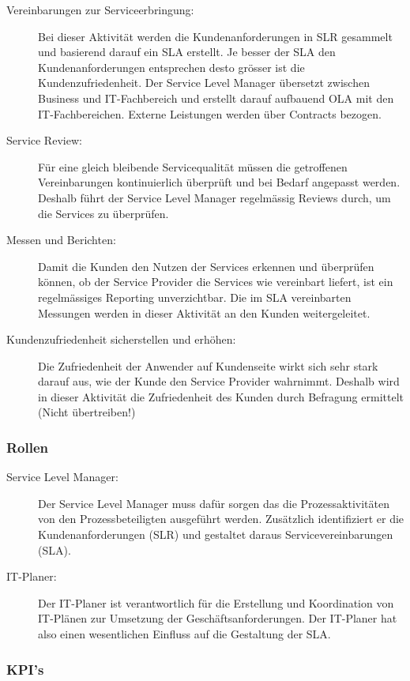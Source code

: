 \begin{description}
	\item[Vereinbarungen zur Serviceerbringung:] Bei dieser Aktivität werden die Kundenanforderungen in SLR gesammelt und basierend darauf ein SLA erstellt. Je besser der SLA den Kundenanforderungen entsprechen desto grösser ist die Kundenzufriedenheit. Der Service Level Manager übersetzt zwischen Business und IT-Fachbereich und erstellt darauf aufbauend OLA mit den IT-Fachbereichen. Externe Leistungen werden über Contracts bezogen.
	\item[Service Review:] Für eine gleich bleibende Servicequalität müssen die getroffenen Vereinbarungen kontinuierlich
	überprüft und bei Bedarf angepasst werden. Deshalb führt der Service Level Manager regelmässig Reviews durch, um die Services zu überprüfen.
	\item[Messen und Berichten:] Damit die Kunden den Nutzen der Services erkennen und überprüfen können, ob der Service
	Provider die Services wie vereinbart liefert, ist ein regelmässiges Reporting unverzichtbar. Die im SLA vereinbarten Messungen werden in dieser Aktivität an den Kunden weitergeleitet.
	\item[Kundenzufriedenheit sicherstellen und erhöhen:] Die Zufriedenheit der Anwender auf Kundenseite wirkt sich sehr stark darauf aus, wie der Kunde den Service Provider wahrnimmt. Deshalb wird in dieser Aktivität die Zufriedenheit des Kunden durch Befragung ermittelt (Nicht übertreiben!)
\end{description}

\subsubsection{Rollen}

\begin{description}
	\item[Service Level Manager:] Der Service Level Manager muss dafür sorgen das die Prozessaktivitäten von den Prozessbeteiligten ausgeführt werden. Zusätzlich identifiziert er die Kundenanforderungen (SLR) und gestaltet daraus Servicevereinbarungen (SLA).
	\item[IT-Planer:] Der IT-Planer ist verantwortlich für die Erstellung und Koordination von IT-Plänen zur Umsetzung der Geschäftsanforderungen. Der IT-Planer hat also einen wesentlichen Einfluss auf die Gestaltung der SLA.
\end{description}

\subsubsection{KPI's}

